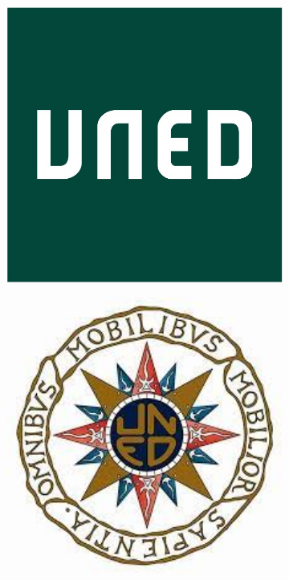 \documentclass[a4paper,12pt]{book}
\begin{document}
\begin{titlepage}
\begin{figure}
    \centering
    \begin{subfigure}[h]{0.3\textwidth}
        \includegraphics[width=1\textwidth, left]{logoUNED.png}
    \end{subfigure}
    \qquad\qquad\qquad\qquad
    \begin{subfigure}[h]{0.3\textwidth}
        \includegraphics[width=1\textwidth, right]{escudoUNED.jpeg}
    \end{subfigure}


\end{figure}
\end{titlepage}
\end{document}
